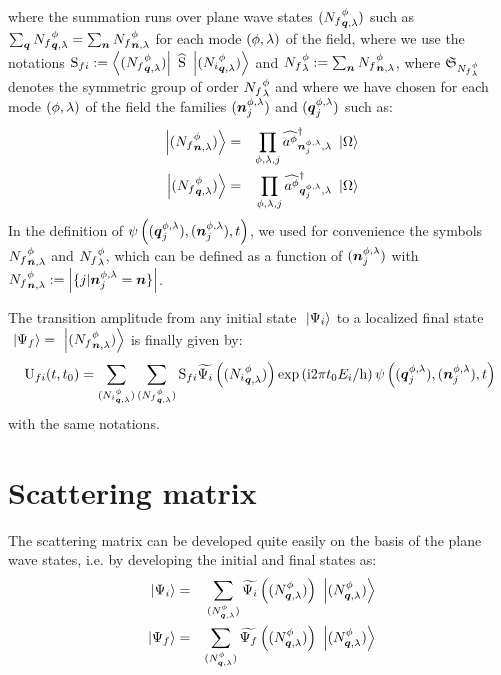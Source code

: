 \documentclass[10pt,a4paper,twoside,openany]{book}
\begin{document}
where the summation runs over plane wave states $\bFQ {N_f} \pt \q \sp$ such as $\sum_{\q} \bQ {N_f} \pt \q \sp = \sum_{\n} \bX {N_f} \pt \n \sp$ for each mode $( \pt, \sp )$ of the field, where we use the notations $\Sm f i \eqdef \bra{\bFQ {N_f} \pt \q \sp} \Sop \ket{\bFQ {N_i} \pt \q \sp}$ and ${N_f}^\pt_\sp \eqdef \sum_{\n} \bX {N_f} \pt \n \sp$, where $\mathfrak{S}_{{N_f}^\pt_\sp}$ denotes the symmetric group of order ${N_f}^\pt_\sp$ and where we have chosen for each mode $( \pt, \sp )$ of the field the families $( \n^{\pt, \sp}_j )$ and $( \q^{\pt, \sp}_j )$ such as:
\begin{eqnarray*}
\ket{\bFX {N_f} \pt \n \sp} & = & \prod_{\pt, \sp, j} \cop \pt {\n^{\pt, \sp}_j} \sp \ket{\vac} \\
\ket{\bFQ {N_f} \pt \q \sp} & = & \prod_{\pt, \sp, j} \cop \pt {\q^{\pt, \sp}_j} \sp \ket{\vac}
\end{eqnarray*}
In the definition of $\psi \left( ( \q^{\pt, \sp}_j ), ( \n^{\pt, \sp}_j ), t \right)$, we used for convenience the symbols $\bX {N_f} \pt \n \sp$ and ${N_f}^\pt_\sp$, which can be defined as a function of $( \n^{\pt, \sp}_j )$ with $\bX {N_f} \pt \n \sp \eqdef \left|  \{ j | \n^{\pt, \sp}_j = \n \} \right|$.

The transition amplitude from any initial state $\ket{\Psi_i}$ to a localized final state $\ket{\Psi_f} = \ket{\bFX {N_f} \pt \n \sp}$ is finally given by:
\begin{equation*}
\Um f i t {t_0} = \sum_{\bFQ {N_i} \pt \q \sp} \sum_{\bFQ {N_f} \pt \q \sp} \Sm f i \FT{\Psi_i} \left( \bFQ {N_i} \pt \q \sp \right) \exp{\i 2 \pi t_0 E_i / \h} \psi \left( ( \q^{\pt, \sp}_j ), ( \n^{\pt, \sp}_j ), t \right)
\end{equation*}
with the same notations.

\section{Scattering matrix}
\label{Scattering matrix}

The scattering matrix can be developed quite easily on the basis of the plane wave states, i.e. by developing the initial and final states as:
\begin{eqnarray*}
\ket{\Psi_i} & = & \sum_{\bFQ N \pt \q \sp} \FT{\Psi_i} \left( \bFQ N \pt \q \sp \right) \ket{\bFQ N \pt \q \sp} \\
\ket{\Psi_f} & = & \sum_{\bFQ N \pt \q \sp} \FT{\Psi_f} \left( \bFQ N \pt \q \sp \right) \ket{\bFQ N \pt \q \sp}
\end{eqnarray*}
\end{document}
